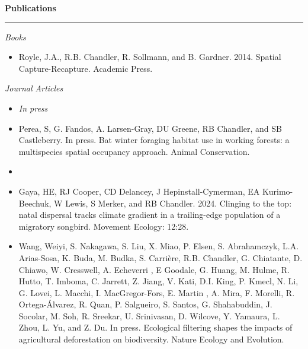 \documentclass[12pt]{article}
\begin{document}
\vspace{0.5cm}

{\large \bf Publications} \\
\rule[3mm]{\textwidth}{0.3mm}

\emph{Books}
\begin{itemize}

\item Royle, J.A., R.B. Chandler, R. Sollmann, and B. Gardner. 2014. Spatial
Capture-Recapture. Academic Press. 

\end{itemize}

\vspace{0.5cm}

\emph{Journal Articles}

\begin{itemize}

\item[] {\centering \it In press \\}

\item Perea, S, G. Fandos, A. Larsen-Gray, DU Greene, RB Chandler, and
  SB Castleberry. In press. Bat winter foraging habitat use in working
  forests: a multispecies spatial occupancy approach. Animal
  Conservation.  

\item[] { \\}

\item  Gaya, HE, RJ Cooper, CD Delancey, J Hepinstall-Cymerman, EA
  Kurimo-Beechuk, W Lewis, S Merker, and RB Chandler. 2024. Clinging
  to the top: natal dispersal tracks climate gradient in a
  trailing-edge population of a migratory songbird. Movement
  Ecology: 12:28.  

\item Wang, Weiyi, S. Nakagawa, S. Liu, X. Miao, P. Elsen,
  S. Abrahamczyk, L.A. Arias-Sosa, K. Buda, M. Budka, S. Carri\`{e}re,
  R.B. Chandler, G. Chiatante, D. Chiawo, W. Cresswell, A. Echeverri ,
  E Goodale, G. Huang, M. Hulme, R. Hutto, T. Imboma, C. Jarrett,
  Z. Jiang, V. Kati, D.I. King, P. Kmecl, N. Li, G. Lovei, L. Macchi,
  I. MacGregor-Fors, E. Martin , A. Mira, F. Morelli,
  R. Ortega-\'{A}lvarez, R. Quan, P. Salgueiro, S. Santos,
  G. Shahabuddin, J. Socolar, M. Soh, R. Sreekar, U. Srinivasan,
  D. Wilcove, Y. Yamaura, L. Zhou, L. Yu, and Z. Du. In
  press. Ecological filtering shapes the impacts of agricultural
  deforestation on biodiversity. Nature Ecology and Evolution. 


\end{itemize}
\end{document}
